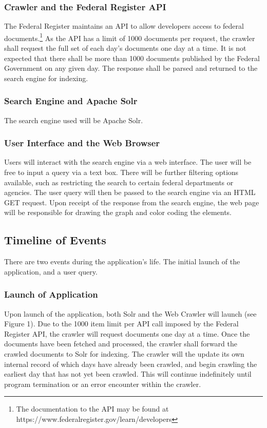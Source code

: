 \documentclass{sig-alternate-05-2015}
\begin{document}
\subsubsection{Crawler and the Federal Register API}
The Federal Register maintains an API to allow developers access to federal documents.\footnote{The documentation to the API may be found at https://www.federalregister.gov/learn/developers} As the API has a limit of 1000 documents per request, the crawler shall request the full set of each day's documents one day at a time. It is not expected that there shall be more than 1000 documents published by the Federal Government on any given day. The response shall be parsed and returned to the search engine for indexing. 

\subsubsection{Search Engine and Apache Solr}
The search engine used will be Apache Solr. 

\subsubsection{User Interface and the Web Browser}
Users will interact with the search engine via a web interface. The user will be free to input a query via a text box. There will be further filtering options available, such as restricting the search to certain federal departments or agencies. The user query will then be passed to the search engine via an HTML GET request. Upon receipt of the response from the search engine, the web page will be responsible for drawing the graph and color coding the elements. 

\subsection{Timeline of Events}
There are two events during the application's life. The initial launch of the application, and a user query.

\subsubsection{Launch of Application}
Upon launch of the application, both Solr and the Web Crawler will launch (see Figure 1). Due to the 1000 item limit per API call imposed by the Federal Register API, the crawler will request documents one day at a time. Once the documents have been fetched and processed, the crawler shall forward the crawled documents to Solr for indexing. The crawler will the update its own internal record of which days have already been crawled, and begin crawling the earliest day that has not yet been crawled. This will continue indefinitely until program termination or an error encounter within the crawler.
\end{document}
